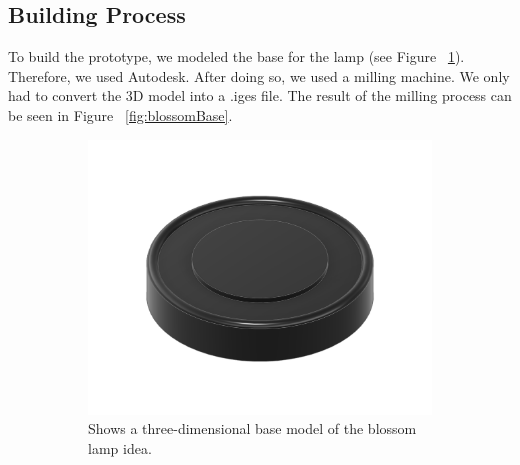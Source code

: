 \documentclass[doc.tex]{subfiles}
\begin{document}
    \subsection{Building Process}
        \begin{flushleft}
            To build the prototype, we modeled the base for the lamp (see Figure ~\ref{fig:blossomBaseModel}). Therefore, we used
            Autodesk. After doing so, we used a milling machine. We only had to convert the 3D model into a .iges file.
            The result of the milling process can be seen in Figure ~\ref{fig:blossomBase}.
        \end{flushleft}

        \begin{figure}[H]
            \centering
            \begin{subfigure}{.45\textwidth}
              \centering
              \includegraphics[scale=0.15]{images/process/FlowerLamp.png}
              \caption{Shows a three-dimensional base model of the blossom lamp idea.}
              \label{fig:blossomBaseModel}
              \vspace{6mm}
            \end{subfigure}
            \hspace{1mm}
            \begin{subfigure}{.45\textwidth}
                \centering

\end{subfigure}
\end{figure}
\end{document}
